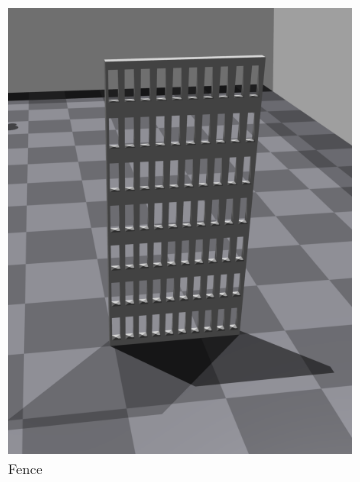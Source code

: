 \begin{figure}[H]
     \centering
     \hspace{0.04\textwidth}
     \begin{subfigure}[b]{0.3\textwidth}
         \centering
         \captionsetup{justification=centering}
         \includegraphics[width=\textwidth]{figures/6_/fence.png}
         \caption{Fence}
         \label{fig:6_obst_fence}
     \end{subfigure} 
     \hspace{0.15\textwidth}
     \begin{subfigure}[b]{0.3\textwidth}
         \centering
         \captionsetup{justification=centering}

\end{subfigure}
\end{figure}
